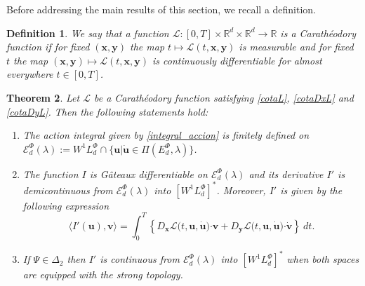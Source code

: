 \documentclass[twoside]{elsarticle}
\newtheorem{thm}{Theorem}[section]
\newtheorem{defi}[thm]{Definition}
\theoremstyle{remark}
\newcommand{\lphi}{L^{\Phi}}
\newcommand{\ephi}{E^{\Phi}}
\newcommand{\wphi}{W^{1}\lphi}
\newcommand{\domi}{\mathcal{E}^{\Phi}_d(\lambda)}
\renewcommand{\b}[1]{\boldsymbol{#1}}
\newcommand{\ccdot}{\b{\cdot}}
\begin{document}
 Before addressing the main results of this section, we recall a definition.  


\begin{defi} We say that a function $\mathcal{L}:[0,T]\times \mathbb{R}^d \times \mathbb{R}^d \rightarrow \mathbb{R}$ is a Carath\'eodory function if for fixed $(\b{x},\b{y})$
the map $t \mapsto \mathcal{L}(t, \b{x},\b{y})$ is measurable  and for fixed $t$ the map  $(\b{x},\b{y}) \mapsto \mathcal{L}(t, \b{x}, \b{y})$ is continuously differentiable for almost everywhere $t\in [0,T]$.

\end{defi}



\begin{thm}\label{teorema_acotacion}
Let $\mathcal{L}$ be a Carath\'eodory function satisfying \eqref{cotaL}, \eqref{cotaDxL} and \eqref{cotaDyL}. 
Then the following statements hold:
\begin{enumerate}
\item \label{T1item1} \label{A1} The action integral given by \eqref{integral_accion}
is finitely defined on $\domi:=W^{1}\lphi_d\cap\{\b{u}|\b{\dot{u}}\in\Pi(\ephi_d,\lambda)\}$.

\item\label{T1item3} The function  $I$ is G\^ateaux differentiable on $\domi$ and  its derivative $I'$ is demicontinuous from $\domi$  into $\left[\wphi_d \right]^*$. Moreover, $I'$ is given by the following expression
\begin{equation}\label{DerAccion}
\langle  I'(\b{u}),\b{v}\rangle= \int_0^T \left\{D_{\b{x}}\mathcal{L}\big(t,\b{u},\b{\dot{u}}\big)\ccdot \b{v}+ D_{\b{y}}\mathcal{L}\big(t,\b{u},\b{\dot{u}}\big)\ccdot\b{\dot{v}}\right\} \ dt.
\end{equation}

\item\label{T1item4}  If  $\Psi \in \Delta_2$ then 
  $I'$ is continuous from $\domi$ into $\left[\wphi_d\right]^*$ when both spaces are equipped with the strong topology.


\end{enumerate}
\end{thm}
\end{document}
